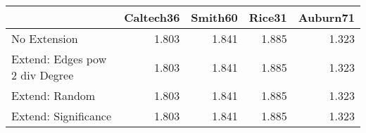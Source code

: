 \begin{tabular}{lrrrr}
\toprule
{} & Caltech36 & Smith60 & Rice31 & Auburn71 \\
\midrule
No Extension                   &     1.803 &   1.841 &  1.885 &    1.323 \\
Extend: Edges pow 2 div Degree &     1.803 &   1.841 &  1.885 &    1.323 \\
Extend: Random                 &     1.803 &   1.841 &  1.885 &    1.323 \\
Extend: Significance           &     1.803 &   1.841 &  1.885 &    1.323 \\
\bottomrule
\end{tabular}
